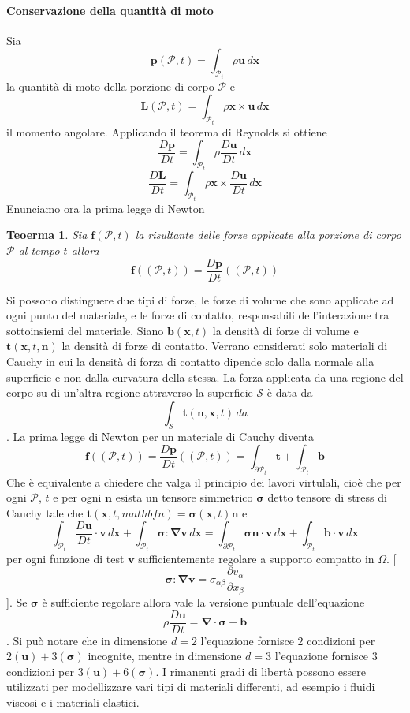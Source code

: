 \documentclass{book}
\newtheorem{theorem}{Teoerma}[section]
\newcommand{\Nabla}{\boldsymbol{\nabla}}
\begin{document}
\paragraph{Conservazione della quantità di moto}
Sia
$$\mathbf{p}(\mathcal{P},t)=\int_{\mathcal{P}_t}\rho\mathbf{u}\,d\mathbf{x}$$
la quantità di moto della porzione di corpo $\mathcal{P}$
e
$$\mathbf{L}(\mathcal{P},t)=\int_{\mathcal{P}_t}\rho\mathbf{x}\times\mathbf{u}\,d\mathbf{x}$$
il momento angolare.
Applicando il teorema di Reynolds si ottiene
$$\frac{D\mathbf{p}}{Dt}=\int_{\mathcal{P}_t}\rho\frac{D\mathbf{u}}{Dt}\,d\mathbf{x}$$
$$\frac{D\mathbf{L}}{Dt}=\int_{\mathcal{P}_t}\rho\mathbf{x}\times\frac{D\mathbf{u}}{Dt}\,d\mathbf{x}$$
Enunciamo ora la prima legge di Newton
\begin{theorem}
	Sia $\mathbf{f}(\mathcal{P},t)$ la risultante delle forze applicate alla porzione di corpo $\mathcal{P}$ al tempo $t$ allora
	$$\mathbf{f}((\mathcal{P},t))=\frac{D\mathbf{p}}{Dt}((\mathcal{P},t))$$
\end{theorem}
Si possono distinguere due tipi di forze, le forze di volume che sono applicate ad ogni punto del materiale, e le forze di contatto, responsabili dell'interazione tra sottoinsiemi del materiale.
Siano $\mathbf{b}(\mathbf{x},t)$ la densità di forze di volume e $\mathbf{t}(\mathbf{x},t,\mathbf{n})$ la densità di forze di contatto. Verrano considerati solo materiali di Cauchy in cui la densità di forza di contatto dipende solo dalla normale alla superficie e non dalla curvatura della stessa.
La forza applicata da una regione del corpo su di un'altra regione attraverso la superficie $\mathcal{S}$ è data da
$$\int_{\mathcal{S}}\mathbf{t}(\mathbf{n},\mathbf{x},t)\,da$$.
La prima legge di Newton per un materiale di Cauchy diventa
$$\mathbf{f}((\mathcal{P},t))=\frac{D\mathbf{p}}{Dt}((\mathcal{P},t)) = \int_{\partial\mathcal{P}_t}\mathbf{t}+\int_{\mathcal{P}_t}\mathbf{b}$$
Che è equivalente a chiedere che valga il principio dei lavori virtulali, cioè che per ogni $\mathcal{P}$, $t$ e per ogni $\mathbf{n}$ esista un tensore simmetrico $\boldsymbol{\sigma}$ detto tensore di stress di Cauchy tale che $\mathbf{t}(\mathbf{x},t,mathbf{n})=\boldsymbol{\sigma}(\mathbf{x},t)\mathbf{n}$ e
$$\int_{\mathcal{P}_t}\frac{D\mathbf{u}}{Dt}\cdot\mathbf{v}\,d\mathbf{x}+\int_{\mathcal{P}_t}\boldsymbol{\sigma}\boldsymbol{:}\Nabla\mathbf{v}\,d\mathbf{x}=\int_{\partial\mathcal{P}_t}\boldsymbol{\sigma}\mathbf{n}\cdot\mathbf{v}\,d\mathbf{x}+\int_{\mathcal{P}_t}\mathbf{b}\cdot\mathbf{v}\,d\mathbf{x}$$
per ogni funzione di test $\mathbf{v}$ sufficientemente regolare a supporto compatto in $\Omega$.
[$$\boldsymbol{\sigma}\boldsymbol{:}\Nabla\mathbf{v}=\sigma_{\alpha\beta}\frac{\partial v_{\alpha}}{\partial x_{\beta}}$$].
Se $\boldsymbol{\sigma}$ è sufficiente regolare allora vale la versione puntuale dell'equazione
$$\rho\frac{D\mathbf{u}}{Dt}=\Nabla\cdot\boldsymbol{\sigma}+\mathbf{b}$$.
Si può notare che in dimensione $d=2$ l'equazione fornisce $2$ condizioni per $2(\mathbf{u})+3(\boldsymbol{\sigma})$ incognite, mentre in dimensione $d=3$ l'equazione fornisce $3$ condizioni per $3(\mathbf{u})+6(\boldsymbol{\sigma})$.
I rimanenti gradi di libertà possono essere utilizzati per modellizzare vari tipi di materiali differenti, ad esempio i fluidi viscosi e i materiali elastici.
\end{document}
